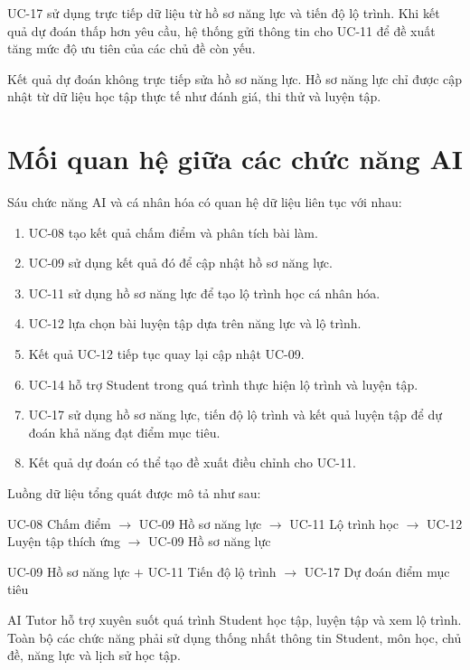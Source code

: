 UC-17 sử dụng trực tiếp dữ liệu từ hồ sơ năng lực và tiến độ lộ trình.
Khi kết quả dự đoán thấp hơn yêu cầu, hệ thống gửi thông tin cho UC-11
để đề xuất tăng mức độ ưu tiên của các chủ đề còn yếu.

Kết quả dự đoán không trực tiếp sửa hồ sơ năng lực. Hồ sơ năng lực chỉ
được cập nhật từ dữ liệu học tập thực tế như đánh giá, thi thử và luyện
tập.

\section{Mối quan hệ giữa các chức năng AI}
\label{sec:ai-function-relationship}

Sáu chức năng AI và cá nhân hóa có quan hệ dữ liệu liên tục với nhau:

\begin{enumerate}
	\item UC-08 tạo kết quả chấm điểm và phân tích bài làm.
	
	\item UC-09 sử dụng kết quả đó để cập nhật hồ sơ năng lực.
	
	\item UC-11 sử dụng hồ sơ năng lực để tạo lộ trình học cá nhân hóa.
	
	\item UC-12 lựa chọn bài luyện tập dựa trên năng lực và lộ trình.
	
	\item Kết quả UC-12 tiếp tục quay lại cập nhật UC-09.
	
	\item UC-14 hỗ trợ Student trong quá trình thực hiện lộ trình và luyện
	tập.
	
	\item UC-17 sử dụng hồ sơ năng lực, tiến độ lộ trình và kết quả luyện
	tập để dự đoán khả năng đạt điểm mục tiêu.
	
	\item Kết quả dự đoán có thể tạo đề xuất điều chỉnh cho UC-11.
\end{enumerate}

Luồng dữ liệu tổng quát được mô tả như sau:

\begin{center}
	UC-08 Chấm điểm
	$\rightarrow$
	UC-09 Hồ sơ năng lực
	$\rightarrow$
	UC-11 Lộ trình học
	$\rightarrow$
	UC-12 Luyện tập thích ứng
	$\rightarrow$
	UC-09 Hồ sơ năng lực
\end{center}

\begin{center}
	UC-09 Hồ sơ năng lực
	$+$
	UC-11 Tiến độ lộ trình
	$\rightarrow$
	UC-17 Dự đoán điểm mục tiêu
\end{center}

AI Tutor hỗ trợ xuyên suốt quá trình Student học tập, luyện tập và xem
lộ trình. Toàn bộ các chức năng phải sử dụng thống nhất thông tin Student,
môn học, chủ đề, năng lực và lịch sử học tập.